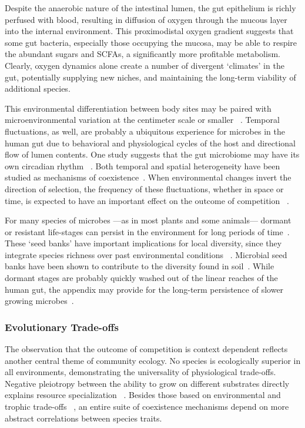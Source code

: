 \documentclass[12pt]{article}
\begin{document}
Despite the anaerobic nature of the intestinal lumen,
the gut epithelium is richly perfused with blood, resulting
in diffusion of oxygen through the mucous layer into
the internal environment.
This proximodistal oxygen gradient suggests that some
gut bacteria, especially those occupying the mucosa,
may be able to respire the abundant sugars and SCFAs,
a significantly more profitable metabolism.
Clearly, oxygen dynamics alone create a number of
divergent `climates' in the gut,
potentially supplying new niches,
and maintaining the long-term viability of additional
species.

This environmental differentiation between body sites may be
paired with microenvironmental variation at the centimeter scale or smaller%
~\citep{Zhang2014}.
Temporal fluctuations, as well, are probably a ubiquitous
experience for microbes in the human gut due to behavioral and physiological
cycles of the host and directional flow of lumen contents.
One study suggests that the gut microbiome may have its own circadian rhythm%
~\citep{Thaiss2014}.
Both temporal and spatial heterogeneity have been studied as
mechanisms of coexistence~\citep{Chesson2000}.
When environmental changes invert the direction of selection,
the frequency of these fluctuations, whether in space or time,
is expected to have an important effect on the outcome of competition%
~\citep{Hutchinson1961}.

For many species of microbes%
---as in most plants and some animals---%
dormant or resistant life-stages can persist in the environment for long
periods of time~\citep{Lennon2011}.
These `seed banks' have important implications for local diversity,
since they integrate species richness over past environmental conditions%
~\citep{Jones2010}.
Microbial seed banks have been shown to contribute to the diversity found in
soil~\citep{Lennon2011}.
While dormant stages are probably quickly washed out of the linear
reaches of the human gut,
the appendix may provide for the long-term persistence of slower growing
microbes~\citep{Bollinger2007}.

\subsubsection{Evolutionary Trade-offs}
The observation that the outcome of competition is context
dependent reflects another central theme of community ecology.
No species is ecologically superior in all environments,
demonstrating the universality of physiological trade-offs.
Negative pleiotropy between the ability to grow on
different substrates directly explains resource specialization%
~\citep{Futuyma1988}.
Besides those based on environmental and trophic trade-offs%
~\citep{Litchman2007},
an entire suite of coexistence mechanisms
depend on more abstract correlations between species traits.
\end{document}
